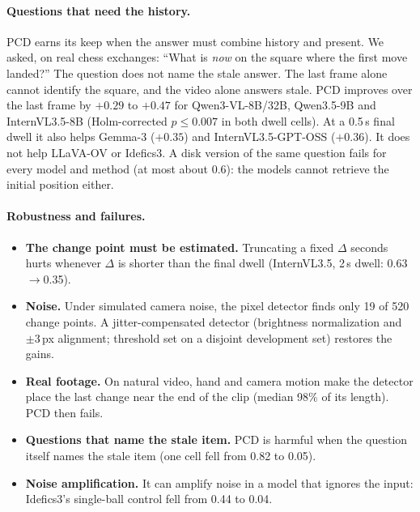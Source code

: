 \documentclass[10pt,twocolumn,letterpaper]{article}
\begin{document}
\paragraph{Questions that need the history.} PCD earns its keep when the answer must combine history and present. We asked, on real chess exchanges: ``What is \emph{now} on the square where the first move landed?'' The question does not name the stale answer. The last frame alone cannot identify the square, and the video alone answers stale. PCD improves over the last frame by $+0.29$ to $+0.47$ for Qwen3-VL-8B/32B, Qwen3.5-9B and InternVL3.5-8B (Holm-corrected $p\le 0.007$ in both dwell cells). At a 0.5\,s final dwell it also helps Gemma-3 ($+0.35$) and InternVL3.5-GPT-OSS ($+0.36$). It does not help LLaVA-OV or Idefics3. A disk version of the same question fails for every model and method (at most about 0.6): the models cannot retrieve the initial position either.

\paragraph{Robustness and failures.}
\begin{itemize}
  \item \textbf{The change point must be estimated.} Truncating a fixed $\Delta$ seconds hurts whenever $\Delta$ is shorter than the final dwell (InternVL3.5, 2\,s dwell: 0.63$\to$0.35).
  \item \textbf{Noise.} Under simulated camera noise, the pixel detector finds only 19 of 520 change points. A jitter-compensated detector (brightness normalization and $\pm3$\,px alignment; threshold set on a disjoint development set) restores the gains.
  \item \textbf{Real footage.} On natural video, hand and camera motion make the detector place the last change near the end of the clip (median 98\% of its length). PCD then fails.
  \item \textbf{Questions that name the stale item.} PCD is harmful when the question itself names the stale item (one cell fell from 0.82 to 0.05).
  \item \textbf{Noise amplification.} It can amplify noise in a model that ignores the input: Idefics3's single-ball control fell from 0.44 to 0.04.
\end{itemize}
\end{document}
